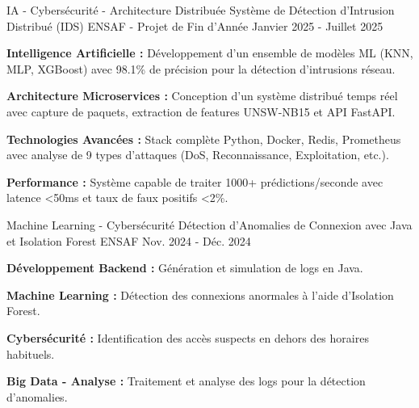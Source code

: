 
\begin{cventries}

  \cventry
  {IA - Cybersécurité - Architecture Distribuée}
  {Système de Détection d'Intrusion Distribué (IDS)} %
  {ENSAF - Projet de Fin d'Année} %
  {Janvier 2025 - Juillet 2025} %
  {
    \begin{cvitems} %
      \item {
                  \textbf{Intelligence Artificielle :}
                  Développement d'un ensemble de modèles ML (KNN, MLP, XGBoost) avec 98.1\% de précision pour la détection d'intrusions réseau.}
      \item {
                  \textbf{Architecture Microservices :}
                  Conception d'un système distribué temps réel avec capture de paquets, extraction de features UNSW-NB15 et API FastAPI.}
      \item {
                  \textbf{Technologies Avancées :}
                  Stack complète Python, Docker, Redis, Prometheus avec analyse de 9 types d'attaques (DoS, Reconnaissance, Exploitation, etc.).}
      \item {
                  \textbf{Performance :}
                  Système capable de traiter 1000+ prédictions/seconde avec latence <50ms et taux de faux positifs <2\%.}
    \end{cvitems}
  }
\end{cventries}
\begin{cventries}
  \cventry
  {Machine Learning - Cybersécurité}
  {Détection d'Anomalies de Connexion avec Java et Isolation Forest} %
  {ENSAF} %
  {Nov. 2024 - Déc. 2024} %
  {
    \begin{cvitems} %
      \item {
                  \textbf{Développement Backend :}
                  Génération et simulation de logs en Java.}
      \item {
                  \textbf{Machine Learning :}
                  Détection des connexions anormales à l’aide d’Isolation Forest.}
      \item {
                  \textbf{Cybersécurité :}
                  Identification des accès suspects en dehors des horaires habituels.}
      \item {
                  \textbf{Big Data - Analyse :}
                  Traitement et analyse des logs pour la détection d’anomalies.}
    \end{cvitems}
  }
\end{cventries}
